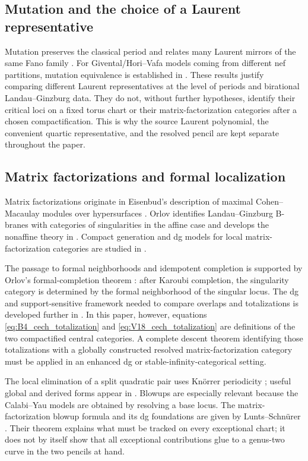 \documentclass[11pt]{amsart}
\theoremstyle{definition}
\theoremstyle{remark}
\begin{document}
\subsection{Mutation and the choice of a Laurent representative}

Mutation preserves the classical period and relates many Laurent mirrors of
the same Fano family \cite{Minkowski}.  For Givental/Hori--Vafa models coming
from different nef partitions, mutation equivalence is established in
\cite{PrinceMutation}.  These results justify comparing different Laurent
representatives at the level of periods and birational Landau--Ginzburg data.
They do not, without further hypotheses, identify their critical loci on a
fixed torus chart or their matrix-factorization categories after a chosen
compactification.  This is why the source Laurent polynomial, the convenient
quartic representative, and the resolved pencil are kept separate throughout
the paper.

\subsection{Matrix factorizations and formal localization}

Matrix factorizations originate in Eisenbud's description of maximal
Cohen--Macaulay modules over hypersurfaces \cite{Eisenbud}.  Orlov identifies
Landau--Ginzburg B-branes with categories of singularities in the affine case
\cite{OrlovDbranes} and develops the nonaffine theory in
\cite{OrlovNonaffine}.  Compact generation and dg models for local
matrix-factorization categories are studied in \cite{Dyckerhoff}.

The passage to formal neighborhoods and idempotent completion is supported by
Orlov's formal-completion theorem \cite{OrlovFormal}: after Karoubi completion,
the singularity category is determined by the formal neighborhood of the
singular locus.  The dg and support-sensitive framework needed to compare
overlaps and totalizations is developed further in \cite{Preygel}.  In this
paper, however, equations \eqref{eq:B4_cech_totalization} and
\eqref{eq:V18_cech_totalization} are definitions of the two compactified
central categories.  A complete descent theorem identifying those
totalizations with a globally constructed resolved matrix-factorization
category must be applied in an enhanced dg or stable-infinity-categorical
setting.

The local elimination of a split quadratic pair uses Kn\"orrer periodicity
\cite{Knorrer}; useful global and derived forms appear in
\cite{OrlovEquivalences,Hirano}.  Blowups are especially relevant because the
Calabi--Yau models are obtained by resolving a base locus.  The
matrix-factorization blowup formula and its dg foundations are given by
Lunts--Schn\"urer \cite{LuntsSchnurer}.  Their theorem explains what must be
tracked on every exceptional chart; it does not by itself show that all
exceptional contributions glue to a genus-two curve in the two pencils at
hand.
\end{document}
